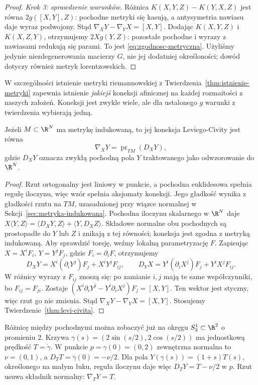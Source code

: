 \begin{proof}
\emph{Krok 3: sprawdzenie warunków.}
Różnica $K(X,Y,Z)-K(Y,X,Z)$ jest równa
$2g([X,Y],Z)$: pochodne metryki
się kasują, a antysymetria nawiasu daje
wyraz podwojony. Stąd
$\nabla_XY-\nabla_YX=[X,Y]$.
Dodając $K(X,Y,Z)$ i $K(X,Z,Y)$,
otrzymujemy $2Xg(Y,Z)$: pozostałe pochodne
i wyrazy z nawiasami redukują się parami.
To jest \eqref{eq:zgodnosc-metryczna}.
Użyliśmy jedynie niezdegenerowania macierzy $G$,
nie jej dodatniej określoności; dowód dotyczy
również metryk lorentzowskich.
\end{proof}

W szczególności istnienie metryki riemannowskiej
z Twierdzenia~\ref{thm:istnienie-metryki}
zapewnia istnienie \emph{jakiejś} koneksji
afinicznej na każdej rozmaitości z naszych założeń.
Koneksji jest zwykle wiele, ale dla ustalonego $g$
warunki z twierdzenia wybierają jedną.

\begin{stwierdzenie}
\label{prop:koneksja-projekcja}
Jeżeli $M\subset\R^N$ ma metrykę indukowaną,
to jej koneksja Leviego-Civity jest równa
\[
 \nabla_XY=\operatorname{pr}_{TM}(D_XY),
\]
gdzie $D_XY$ oznacza zwykłą pochodną pola $Y$
traktowanego jako odwzorowanie do $\R^N$.
\end{stwierdzenie}
\begin{proof}
Rzut ortogonalny jest liniowy w punkcie,
a pochodna euklidesowa spełnia regułę iloczynu,
więc wzór spełnia aksjomaty koneksji.
Jego gładkość wynika z gładkości rzutu na $TM$,
uzasadnionej przy wiązce normalnej w
Sekcji~\ref{sec:metryka-indukowana}.
Pochodna iloczynu
skalarnego w $\R^N$ daje
$X\langle Y,Z\rangle
=\langle D_XY,Z\rangle+\langle Y,D_XZ\rangle$.
Składowe normalne obu pochodnych są prostopadłe
do $Y$ lub $Z$ i znikają z tej równości;
koneksja jest zgodna z metryką indukowaną.
Aby sprawdzić torsję, weźmy lokalną parametryzację $F$.
Zapisując $X=X^iF_i$, $Y=Y^jF_j$, gdzie
$F_i=\partial_iF$, otrzymujemy
\[
 D_XY=X^i(\partial_iY^j)F_j+X^iY^jF_{ij},
 \qquad
 D_YX=Y^i(\partial_iX^j)F_j+Y^iX^jF_{ij}.
\]
W różnicy wyrazy z $F_{ij}$ znoszą się:
po zamianie $i,j$ mają te same współczynniki,
bo $F_{ij}=F_{ji}$. Zostaje
$(X^i\partial_iY^j-Y^i\partial_iX^j)F_j=[X,Y]$.
Ten wektor jest styczny, więc rzut go nie zmienia.
Stąd $\nabla_XY-\nabla_YX=[X,Y]$.
Stosujemy Twierdzenie~\ref{thm:levi-civita}.
\end{proof}

Różnicę między pochodnymi można zobaczyć już na okręgu
$S_2^1\subset\R^2$ o promieniu $2$.
Krzywa $\gamma(s)=(2\sin(s/2),2\cos(s/2))$ ma jednostkową
prędkość $T=\dot\gamma$. W punkcie $p=\gamma(0)=(0,2)$
zewnętrzna normalna to $\nu=(0,1)$, a
$D_TT=\ddot\gamma(0)=-\nu/2$.
Dla pola $Y(\gamma(s))=(1+s)T(s)$, określonego na małym łuku,
reguła iloczynu daje więc $D_TY=T-\nu/2$ w $p$.
Rzut usuwa składnik normalny: $\nabla_TY=T$.

